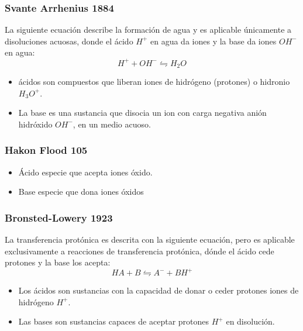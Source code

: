 \subsubsection{Svante Arrhenius 1884}
\begin{definition}
	La siguiente ecuación describe la formación de agua y es aplicable únicamente a disoluciones acuosas, donde el ácido $H^{+}$ en agua da iones y la base da iones $OH^{-}$ en agua:
	\begin{equation}
		H^{+}+OH^{-}\leftrightharpoons H_{2}O
	\end{equation}
\end{definition}

\begin{itemize}
	\item ácidos son compuestos que liberan iones de hidrógeno (protones) o hidronio $H_{3}O^{+}$.
	\item La base es una sustancia que disocia un ion con carga negativa anión hidróxido $OH^{-}$, en un medio acuoso.
\end{itemize}

\subsubsection{Hakon Flood 105}
\begin{itemize}
	\item Ácido especie que acepta iones óxido.
	\item Base especie que dona iones óxidos
\end{itemize}

\subsubsection{Bronsted-Lowery 1923}
\begin{definition}
	La transferencia protónica es descrita con la siguiente ecuación, pero es aplicable exclusivamente a reacciones de transferencia protónica, dónde el ácido cede protones y la base los acepta:
	\begin{equation}
		HA+B\leftrightharpoons A^{-}+BH^{+}
	\end{equation}
\end{definition}
\begin{itemize}
	\item Los ácidos son sustancias con la capacidad de donar o ceder protones iones de hidrógeno $H^{+}$.
	\item Las bases son sustancias capaces de aceptar protones $H^{+}$ en disolución.
\end{itemize}


